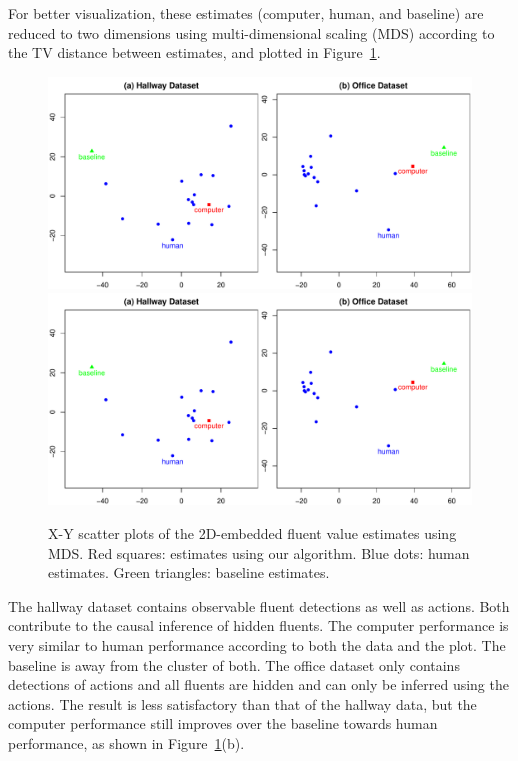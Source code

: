 \documentclass[10pt,journal,letterpaper,compsoc]{IEEEtran}
\begin{document}


For better visualization, these estimates (computer, human, and baseline) are reduced to two dimensions using multi-dimensional scaling (MDS) according to the TV distance between estimates, and plotted in Figure~\ref{fig:results}.

\begin{figure}[htp]
\centering
\includegraphics[trim = 0in 0in 5in 0in, clip,width=.75\linewidth]{results.pdf}
\includegraphics[trim = 5in 0in 0in 0in, clip,width=.75\linewidth]{results.pdf}
\caption{X-Y scatter plots of the 2D-embedded fluent value estimates using MDS. Red squares: estimates using our algorithm. Blue dots: human estimates. Green triangles: baseline estimates. \label{fig:results}}
\end{figure}

The hallway dataset contains observable fluent detections as well as actions. Both contribute to the causal inference of hidden fluents. The computer performance is very similar to human performance according to both the data and the plot. The baseline is away from the cluster of both.  The office dataset only contains detections of actions and all fluents are hidden and can only be inferred using the actions. The result is less satisfactory than that of the hallway data, but the computer performance still improves over the baseline towards human performance, as shown in Figure~\ref{fig:results}(b).
\end{document}
